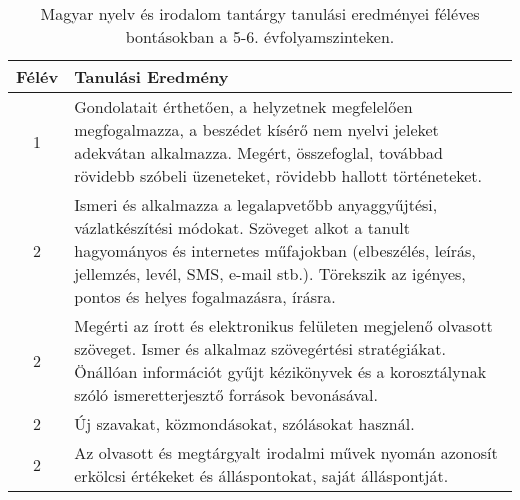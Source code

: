        
           \begin{longtable}{c | p{12cm} }
            \caption[Magyar nyelv és irodalom 5-6.]{Magyar nyelv és irodalom tantárgy tanulási eredményei féléves bontásokban a 5-6. évfolyamszinteken. }  \\

            \textbf{Félév} & \textbf{Tanulási Eredmény} \\
            \hline
            \endhead
                                
                                      
                                
                                          1 &  Gondolatait érthetően, a helyzetnek megfelelően megfogalmazza, a beszédet kísérő nem nyelvi jeleket adekvátan alkalmazza. Megért, összefoglal, továbbad rövidebb szóbeli üzeneteket, rövidebb hallott történeteket. \\ \hline
                                      
                                
                                          2 &  Ismeri és alkalmazza a legalapvetőbb anyaggyűjtési, vázlatkészítési módokat. Szöveget alkot a tanult hagyományos és internetes műfajokban (elbeszélés, leírás, jellemzés, levél, SMS, e-mail stb.). Törekszik az igényes, pontos és helyes fogalmazásra, írásra. \\ \hline
                                          2 &  Megérti az írott és elektronikus felületen megjelenő olvasott szöveget.
Ismer és alkalmaz szövegértési stratégiákat.
Önállóan információt gyűjt kézikönyvek és a korosztálynak szóló ismeretterjesztő források bevonásával. \\ \hline
                                          2 &  Új szavakat, közmondásokat, szólásokat használ. \\ \hline
                                          2 &  Az olvasott és megtárgyalt irodalmi művek nyomán azonosít erkölcsi értékeket és álláspontokat, saját álláspontját. \\ \hline
                                      
                                
                                      

\end{longtable}
